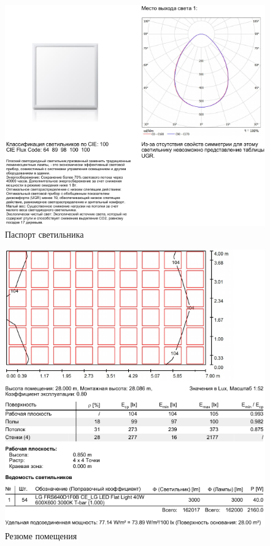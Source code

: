 \begin{figure}[p]
\centering
\includegraphics[width=\textwidth]{lights_1}
\caption{Паспорт светильника}
\label{pic:light_1}
\end{figure}
\begin{figure}[p]
\centering
\includegraphics[width=\textwidth]{lights_2}
\caption{Резюме помещения}
\label{pic:light_2}
\end{figure}
